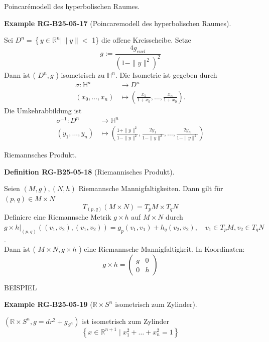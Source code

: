 \documentclass[10pt, letterpaper]{article}
\newcommand{\R}{\mathbb{R}}
\newcommand{\CustomHeading}[3]{%
  \par\medskip\noindent%
  \textbf{#1 #2} \textnormal{(#3)}.\enskip%
}
\newenvironment{DEF}[2]{\begin{unitbox}\CustomHeading{Definition}{#1}{#2}}{\end{unitbox}}
\newenvironment{EXA}[2]{\begin{unitbox}\CustomHeading{Example}{#1}{#2}}{\end{unitbox}}
\begin{document}
Poincarémodell des hyperbolischen Raumes. 

\begin{EXA}{RG-B25-05-17}{Poincaremodell des hyperbolischen Raumes}
Sei $D^{n}=\left\{y \in \mathbb{R}^{n} \mid\|y\|<\right.$ 1\} die offene Kreisscheibe. Setze
$$
g:=\frac{4 g_{e u c l}}{\left(1-\|y\|^{2}\right)^{2}}
$$
Dann ist ( $D^{n}, g$ ) isometrisch zu $\mathbb{H}^{n}$. Die Isometrie ist gegeben durch
$$
\begin{aligned}
\sigma: \mathbb{H}^{n} & \rightarrow D^{n} \\
\left(x_{0}, \ldots, x_{n}\right) & \mapsto\left(\frac{x_{1}}{1+x_{0}}, \ldots, \frac{x_{n}}{1+x_{0}}\right) .
\end{aligned}
$$
Die Umkehrabbildung ist
$$
\begin{aligned}
\sigma^{-1}: D^{n} & \rightarrow \mathbb{H}^{n} \\
\left(y_{1}, \ldots, y_{n}\right) & \mapsto\left(\frac{1+\|y\|^{2}}{1-\|y\|^{2}}, \frac{2 y_{1}}{1-\|y\|^{2}}, \ldots, \frac{2 y_{n}}{1-\|y\|^{2}}\right)
\end{aligned}
$$
\end{EXA}



Riemannsches Produkt. 


\begin{DEF}{RG-B25-05-18}{Riemannisches Produkt}
Seien $(M, g),(N, h)$ Riemannsche Mannigfaltigkeiten. Dann gilt für $(p, q) \in M \times N$
$$
T_{(p, q)}(M \times N)=T_{p} M \times T_{q} N
$$
Definiere eine Riemannsche Metrik $g \times h$ auf $M \times N$ durch $g \times\left. h\right|_{(p, q)}\left(\left(v_{1}, v_{2}\right),\left(v_{1}, v_{2}\right)\right)=g_{p}\left(v_{1}, v_{1}\right)+h_{q}\left(v_{2}, v_{2}\right), \quad v_{1} \in T_{p} M, v_{2} \in T_{q} N$.\\
Dann ist ( $M \times N, g \times h$ ) eine Riemannsche Mannigfaltigkeit. In Koordinaten:
$$
g \times h=\left(\begin{array}{cc}
g & 0 \\
0 & h
\end{array}\right)
$$
\end{DEF}



BEISPIEL 


\begin{EXA}{RG-B25-05-19}{$\R\times S^n$ isometrisch zum Zylinder}
$(\mathbb{R} \times S^{n}, g=d r^{2}+g_{S^{n}})$ ist isometrisch zum Zylinder
$$
\left\{x \in \mathbb{R}^{n+1} \mid x_{1}^{2}+\ldots+x_{n}^{2}=1\right\}
$$
\end{EXA}
\end{document}
